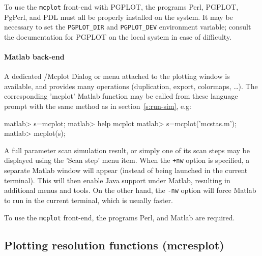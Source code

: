 To use the \verb+mcplot+ front-end with PGPLOT, the programs Perl, PGPLOT,
PgPerl, and PDL must all be properly installed on the system.  It may be
necessary to set the \verb+PGPLOT_DIR+ and \verb+PGPLOT_DEV+ environment
variable; consult the documentation for PGPLOT on the local system in case of
difficulty.   

\paragraph{Matlab back-end}

A dedicated \MCS /Mcplot Dialog or menu attached to the plotting window is
available, and provides many operations (duplication, export, colormaps,
\ldots).  The corresponding 'mcplot' Matlab function may be called
from these language prompt with the same method as in section~\ref{s:run-sim},
e.g:
\begin{matlab}
    matlab> s=mcplot;
    matlab> help mcplot
    matlab> s=mcplot('mcstas.m');
    matlab> mcplot(s);
\end{matlab} 

A full parameter scan simulation result, or simply one of its scan steps may be
displayed using the 'Scan step' menu item.  When the \verb|+nw| option is
specified, a separate Matlab window will appear (instead of being
launched in the current terminal). This will then enable Java support under
Matlab, resulting in additional menus and tools. On
the other hand, the \verb|-nw| option will force Matlab to run in the
current terminal, which is usually faster.

To use the \verb+mcplot+ front-end, the programs Perl, and
Matlab are required. 


\subsection{Plotting resolution functions (mcresplot)}
\label{s:mcresplot}

